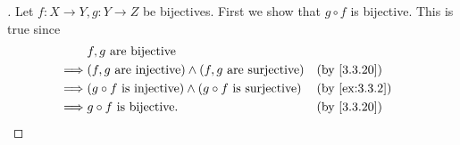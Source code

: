 \begin{proof}[]
  Let \(f : X \to Y, g : Y \to Z\) be bijectives.
  First we show that \(g \circ f\) is bijective.
  This is true since
  \begin{align*}
             & f, g \text{ are bijective}                                                                  \\
    \implies & (f, g \text{ are injective}) \land (f, g \text{ are surjective})         &  & \by{3.3.20}   \\
    \implies & (g \circ f \text{ is injective}) \land (g \circ f \text{ is surjective}) &  & \by{ex:3.3.2} \\
    \implies & g \circ f \text{ is bijective}.                                          &  & \by{3.3.20}
  \end{align*}


\end{proof}
